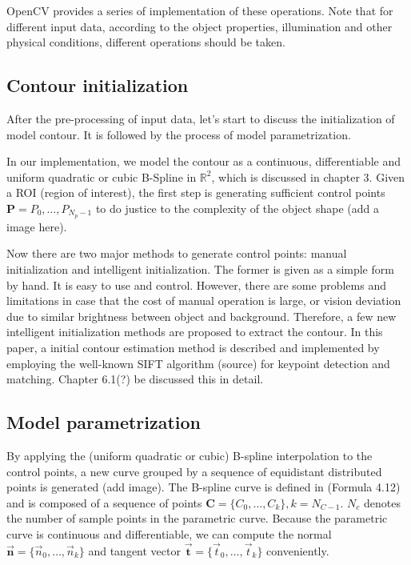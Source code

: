 OpenCV provides a series of implementation of these operations. Note
that for different input data, according to the object properties,
illumination and other physical conditions, different operations
should be taken. 

\subsection{Contour initialization}
\label{sec:mp}

After the pre-processing of input data, let's start to discuss the
initialization of model contour. It is followed by the process of
model parametrization.

In our implementation, we model the
contour as a continuous, differentiable and uniform quadratic or cubic
B-Spline in $\mathbb{R}^2$, which is discussed in chapter 3. 
Given a ROI (region of interest), the first step is generating
sufficient control points $\mathbf{P} = {P_0, \ldots, P_{N_p-1}}$ to
do justice to the complexity of the object shape (add a image here).

Now there are two major methods to generate control points:
manual initialization and intelligent initialization. The former is
given as a simple form by hand. It is easy to use and
control. However, there are some problems and limitations in case that
the cost of manual operation is large, or vision deviation due to
similar brightness between object and background. Therefore, a few new
intelligent initialization methods are proposed to extract the
contour.
In this paper, a initial contour estimation method is described and
implemented by employing the well-known SIFT algorithm (source) for
keypoint detection and matching. Chapter 6.1(?) be discussed this in
detail.

\subsection{Model parametrization}
\label{sec:mp}

By applying the (uniform quadratic or cubic) B-spline interpolation to the control points, a new curve
grouped by a sequence of equidistant distributed points is generated
(add image). The B-spline curve is defined in (Formula 4.12) and is
composed of a sequence of points $\mathbf{C} = \{C_0, \ldots,
C_{k}\}, k = N_{C-1}$. $N_c$ denotes the number of sample points in the
parametric curve. Because the parametric curve is continuous and
differentiable, we can compute the normal $\vec{\mathbf{n}} = \{\vec{n}_0, \ldots,
\vec{n}_{k}\}$ and tangent vector $\vec{\mathbf{t}} = \{\vec{t}_0, \ldots, \vec{t}_{k}\}$
conveniently. 

